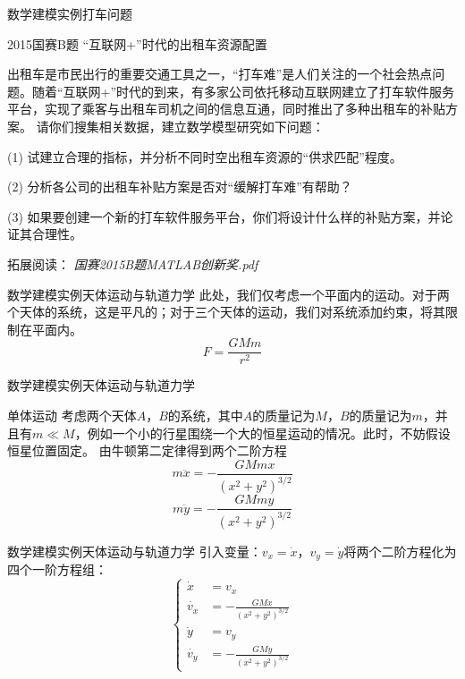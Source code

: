 \documentclass{beamer}
\begin{document}
\begin{frame}{数学建模实例}{打车问题}
\begin{block}{2015国赛B题 “互联网+”时代的出租车资源配置}

出租车是市民出行的重要交通工具之一，“打车难”是人们关注的一个社会热点问题。随着“互联网+”时代的到来，有多家公司依托移动互联网建立了打车软件服务平台，实现了乘客与出租车司机之间的信息互通，同时推出了多种出租车的补贴方案。
请你们搜集相关数据，建立数学模型研究如下问题：

(1) 试建立合理的指标，并分析不同时空出租车资源的“供求匹配”程度。

(2) 分析各公司的出租车补贴方案是否对“缓解打车难”有帮助？

(3) 如果要创建一个新的打车软件服务平台，你们将设计什么样的补贴方案，并论证其合理性。

\footnotesize 拓展阅读：
\emph{国赛2015B题MATLAB创新奖.pdf}
\end{block}
\end{frame}

\begin{frame}{数学建模实例}{天体运动与轨道力学}
此处，我们仅考虑一个平面内的运动。对于两个天体的系统，这是平凡的；对于三个天体的运动，我们对系统添加约束，将其限制在平面内。
$$F = \frac{GMm}{r^2}$$
\end{frame}

\begin{frame}{数学建模实例}{天体运动与轨道力学}
\begin{block}{单体运动}
考虑两个天体$A$，$B$的系统，其中$A$的质量记为$M$，$B$的质量记为$m$，并且有$m \ll M$，例如一个小的行星围绕一个大的恒星运动的情况。此时，不妨假设恒星位置固定。
由牛顿第二定律得到两个二阶方程
$$m\ddot{x}=-\frac{GMmx}{(x^2+y^2)^{3/2}}$$
$$m\ddot{y}=-\frac{GMmy}{(x^2+y^2)^{3/2}}$$
\end{block}
\end{frame}

\begin{frame}{数学建模实例}{天体运动与轨道力学}
引入变量：$v_x=\dot{x}$，$v_y=\dot{y}$将两个二阶方程化为四个一阶方程组：
$$
\left \{
\begin{aligned}
\dot{x}   & =  v_x \\
\dot{v_x} & =  -\frac{GMx}{(x^2+y^2)^{3/2}} \\
\dot{y}   & =  v_y \\
\dot{v_y} & =  -\frac{GMy}{(x^2+y^2)^{3/2}} 
\end{aligned}
\right. 
$$

\end{frame}
\end{document}

